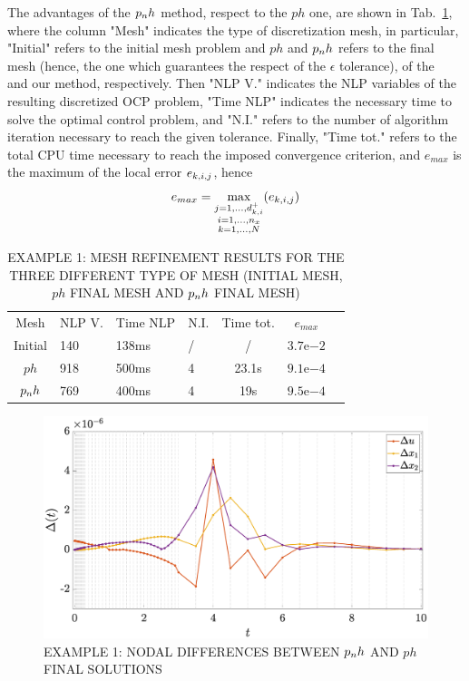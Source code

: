 The advantages of the $p_{n}h$ method, respect to the $ph$ one, are shown in Tab.~\ref{tab:tablevanderpol}, where the column "Mesh" indicates the type of discretization mesh, in particular, "Initial" refers to the initial mesh problem and $ph$ and $p_{n}h$ refers to the final mesh (hence, the one which guarantees the respect of the $\epsilon$ tolerance), of the~\cite{Patterson:OCAM:2015} and our method, respectively. Then "NLP V." indicates the NLP variables of the resulting discretized OCP problem, "Time NLP" indicates the necessary time to solve the optimal control problem, and "N.I." refers to the number of algorithm iteration necessary to reach the given tolerance. Finally, "Time tot." refers to the total CPU time necessary to reach the imposed convergence criterion, and $e_{max}$  is the maximum of the local error $e_{k,i,j}$, hence
\begin{equation}
e_{max}= \max\limits_{\substack{j = 1, \dots, d_{k,i}^{+} \\ i = 1, \dots, n_x \\ k = 1, \dots, N}} (e_{k,i,j})
\end{equation}
\begin{table}[t]
	\caption{EXAMPLE 1: MESH REFINEMENT RESULTS FOR THE THREE DIFFERENT TYPE OF MESH (INITIAL MESH, $ph$ FINAL MESH AND $p_{n}h$ FINAL MESH)}
	\begin{center}
		\label{tab:tablevanderpol}
		\begin{tabular}{c l l l c c c}
			& & \\ %
			\hline
			Mesh & NLP V. & Time NLP & N.I. & Time tot. & $e_{max}$ \\
			\hline
			Initial & 140 & 138ms & / & / &  $3.7\mathrm{e}{-2}$\\
			$ph$ & 918 & 500ms & 4 & 23.1s & $9.1\mathrm{e}{-4}$ \\
			$p_{n}h$ & 769 & 400ms & 4 & 19s & $9.5\mathrm{e}{-4}$ \\
			\hline
		\end{tabular}
	\end{center}
\end{table}
\begin{figure}[t]
	\centering
	\includegraphics[trim={2cm 0cm 4cm 0cm},clip,width=1\columnwidth]{Img/delta_vanderpol}
	\caption{EXAMPLE 1: NODAL DIFFERENCES BETWEEN $p_{n}h$ AND $ph$ FINAL SOLUTIONS}
	\label{fig:deltavanderpol}
\end{figure}
